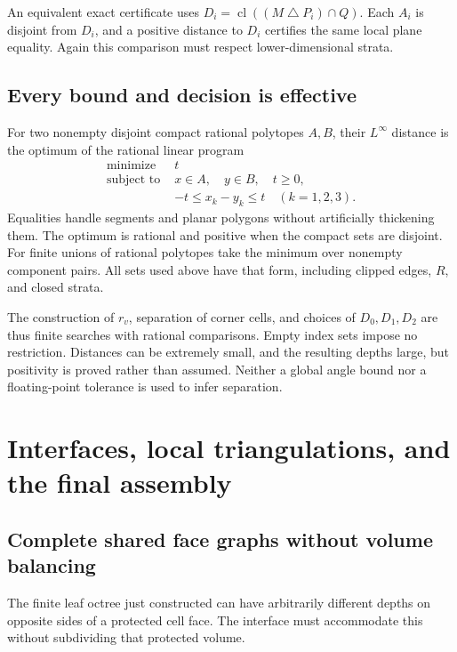 \documentclass[11pt]{article}
\theoremstyle{definition}
\theoremstyle{remark}
\newcommand{\cl}{\operatorname{cl}}
\newcommand{\symdiff}{\mathbin{\triangle}}
\begin{document}
An equivalent exact certificate uses
$D_i=\cl((M\symdiff P_i)\cap Q)$. Each $A_i$ is disjoint from $D_i$,
and a positive distance to $D_i$ certifies the same local plane equality.
Again this comparison must respect lower-dimensional strata.

\subsection{Every bound and decision is effective}
\label{sec:effective}

For two nonempty disjoint compact rational polytopes $A,B$, their
$L^\infty$ distance is the optimum of the rational linear program
\[
\begin{aligned}
  \text{minimize }&t\\
  \text{subject to }&x\in A,\quad y\in B,\quad t\ge0,\\
  &-t\le x_k-y_k\le t\quad(k=1,2,3).
\end{aligned} \tag{10}\label{eq:lp-distance}
\]
Equalities handle segments and planar polygons without artificially
thickening them. The optimum is rational and positive when the compact
sets are disjoint. For finite unions of rational polytopes take the
minimum over nonempty component pairs. All sets used above have that
form, including clipped edges, $R$, and closed strata.

The construction of $r_v$, separation of corner cells, and choices of
$D_0,D_1,D_2$ are thus finite searches with rational comparisons. Empty
index sets impose no restriction. Distances can be extremely small,
and the resulting depths large, but positivity is proved rather than
assumed. Neither a global angle bound nor a floating-point tolerance
is used to infer separation.

\section{Interfaces, local triangulations, and the final assembly}
\label{sec:assembly}

\subsection{Complete shared face graphs without volume balancing}

The finite leaf octree just constructed can have arbitrarily different
depths on opposite sides of a protected cell face. The interface must
accommodate this without subdividing that protected volume.
\end{document}
